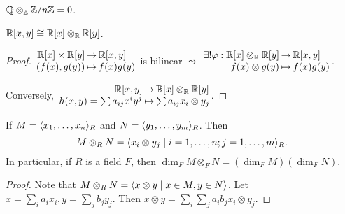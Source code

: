 \begin{example}
  $\mathbb{Q} \otimes_{\mathbb{Z}} {\mathbb{Z}}/{n\mathbb{Z}} = 0$.
\end{example}

\begin{example}
  $\mathbb{R}[x, y] \cong \mathbb{R}[x] \otimes_{\mathbb{R}} \mathbb{R}[y]$.
  \begin{proof}
    $\arraycolsep=1pt
    \begin{array}{rcl}
      \Rb[x] \times \Rb[y] & \to & \Rb[x, y] \\
      ( f(x), g(y) ) & \mapsto & f(x)g(y)
    \end{array}$
    is bilinear $\leadsto$
    $\arraycolsep=1pt
    \begin{array}{rcl}
      \exists! \varphi: \Rb[x] \otimes_\Rb \Rb[y] & \to & \Rb[x, y] \\
       f(x) \otimes g(y) & \mapsto & f(x)g(y)
    \end{array}$.

    Conversely, 
    $\arraycolsep=1pt
    \begin{array}{rcl}
      \Rb[x, y] & \to & \Rb[x] \otimes_\Rb \Rb[y] \\
      h(x, y) = \sum a_{ij} x^i y^j & \mapsto & \sum a_{ij} x_i \otimes y_j
    \end{array}$.
  \end{proof}
\end{example}

\begin{prop}
  If $M = \langle x_1, \dots, x_n\rangle_R$ and $N = \langle y_1, \dots, y_m\rangle_R$. Then
  \[ M \otimes_R N = \langle x_i \otimes y_j \mid i = 1, \dots, n;
  j = 1, \dots, m\rangle_R. \]
  In particular, if $R$ is a field $F$, then
  $\dim_F M\otimes_F N = (\dim_F M)(\dim_F N)$.
  \begin{proof}
    Note that $M \otimes_R N = \langle x \otimes y \mid x \in M, y \in N\rangle$.
    Let $x = \sum_i a_ix_i, y = \sum_j b_jy_j$. Then
    $x\otimes y = \sum_i \sum_j a_ib_j x_i \otimes y_j$.
  \end{proof}
\end{prop}

